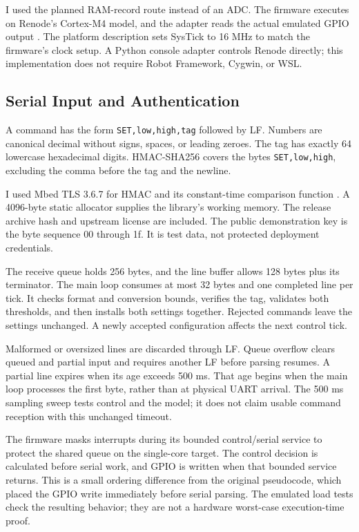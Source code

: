 \documentclass[conference]{IEEEtran}
\begin{document}
I used the planned RAM-record route instead of an ADC. The firmware executes on Renode's Cortex-M4 model, and the adapter reads the actual emulated GPIO output \cite{renode}. The platform description sets SysTick to 16 MHz to match the firmware's clock setup. A Python console adapter controls Renode directly; this implementation does not require Robot Framework, Cygwin, or WSL.

\subsection{Serial Input and Authentication}
A command has the form \texttt{SET,low,high,tag} followed by LF. Numbers are canonical decimal without signs, spaces, or leading zeroes. The tag has exactly 64 lowercase hexadecimal digits. HMAC-SHA256 covers the bytes \texttt{SET,low,high}, excluding the comma before the tag and the newline.

I used Mbed TLS 3.6.7 for HMAC and its constant-time comparison function \cite{mbedtls}. A 4096-byte static allocator supplies the library's working memory. The release archive hash and upstream license are included. The public demonstration key is the byte sequence 00 through 1f. It is test data, not protected deployment credentials.

The receive queue holds 256 bytes, and the line buffer allows 128 bytes plus its terminator. The main loop consumes at most 32 bytes and one completed line per tick. It checks format and conversion bounds, verifies the tag, validates both thresholds, and then installs both settings together. Rejected commands leave the settings unchanged. A newly accepted configuration affects the next control tick.

Malformed or oversized lines are discarded through LF. Queue overflow clears queued and partial input and requires another LF before parsing resumes. A partial line expires when its age exceeds 500 ms. That age begins when the main loop processes the first byte, rather than at physical UART arrival. The 500 ms sampling sweep tests control and the model; it does not claim usable command reception with this unchanged timeout.

The firmware masks interrupts during its bounded control/serial service to protect the shared queue on the single-core target. The control decision is calculated before serial work, and GPIO is written when that bounded service returns. This is a small ordering difference from the original pseudocode, which placed the GPIO write immediately before serial parsing. The emulated load tests check the resulting behavior; they are not a hardware worst-case execution-time proof.
\end{document}
